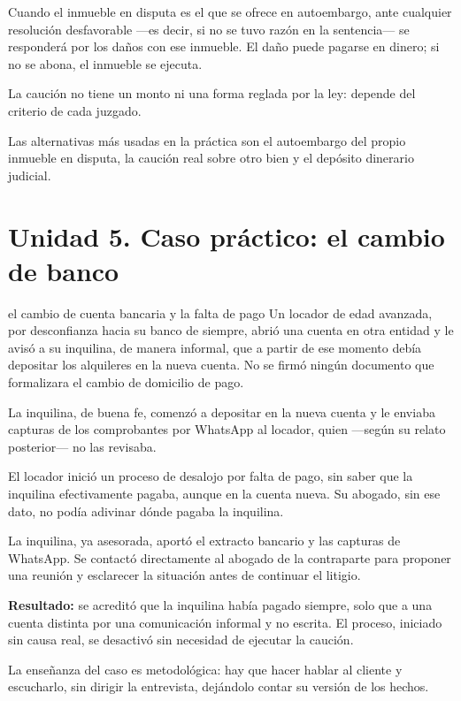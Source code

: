 \documentclass[12pt,oneside]{book}
\begin{document}
Cuando el inmueble en disputa es el que se ofrece en autoembargo, ante cualquier resolución desfavorable ---es decir, si no se tuvo razón en la sentencia--- se responderá por los daños con ese inmueble. El daño puede pagarse en dinero; si no se abona, el inmueble se ejecuta.

\begin{important}
La caución no tiene un monto ni una forma reglada por la ley: depende del criterio de cada juzgado.

Las alternativas más usadas en la práctica son el autoembargo del propio inmueble en disputa, la caución real sobre otro bien y el depósito dinerario judicial.
\end{important}

\section{Unidad 5. Caso práctico: el cambio de banco}

\begin{example}{el cambio de cuenta bancaria y la falta de pago}
Un locador de edad avanzada, por desconfianza hacia su banco de siempre, abrió una cuenta en otra entidad y le avisó a su inquilina, de manera informal, que a partir de ese momento debía depositar los alquileres en la nueva cuenta. No se firmó ningún documento que formalizara el cambio de domicilio de pago.

La inquilina, de buena fe, comenzó a depositar en la nueva cuenta y le enviaba capturas de los comprobantes por WhatsApp al locador, quien ---según su relato posterior--- no las revisaba.

El locador inició un proceso de desalojo por falta de pago, sin saber que la inquilina efectivamente pagaba, aunque en la cuenta nueva. Su abogado, sin ese dato, no podía adivinar dónde pagaba la inquilina.

La inquilina, ya asesorada, aportó el extracto bancario y las capturas de WhatsApp. Se contactó directamente al abogado de la contraparte para proponer una reunión y esclarecer la situación antes de continuar el litigio.

\textbf{Resultado:} se acreditó que la inquilina había pagado siempre, solo que a una cuenta distinta por una comunicación informal y no escrita. El proceso, iniciado sin causa real, se desactivó sin necesidad de ejecutar la caución.
\end{example}

La enseñanza del caso es metodológica: hay que hacer hablar al cliente y escucharlo, sin dirigir la entrevista, dejándolo contar su versión de los hechos.
\end{document}

